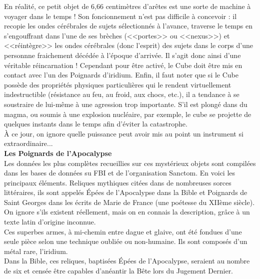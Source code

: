 \documentclass[11pt,twoside,a4paper]{book}
\begin{document}
En r{\'e}alit{\'e}, ce petit objet de 6,66 centim{\`e}tres d'ar{\^e}tes est une sorte de machine {\`a} voyager dans le temps ! Son foncionnement n'est pas difficile {\`a} concevoir : il recopie les ondes c{\'e}r{\'e}brales de sujets s{\'e}lectionn{\'e}s {\`a} l'avance, traverse le temps en s'engouffrant dans l'une de ses br{\`e}ches (<<portes>> ou <<nexus>>) et <<r{\'e}int{\`e}gre>> les ondes c{\'e}r{\'e}brales (donc l'esprit) des sujets dans le corps d'une personnne fraichement d{\'e}c{\'e}d{\'e}e {\`a} l'{\'e}poque d'arriv{\'e}e. Il s'agit donc ainsi d'une v{\'e}ritable r{\'e}incarnation ! Cependant pour {\^e}tre activ{\'e}, le Cube doit {\^e}tre mis en contact avec l'un des Poignards d'iridium. Enfin, il faut noter que si le Cube poss{\`e}de des propri{\'e}t{\'e}s physiques particuli{\`e}res qui le rendent virtuellement indestructible (r{\'e}sistance au feu, au froid, aux chocs, etc.), il a tendance {\`a} se soustraire de lui-m{\^e}me {\`a} une agression trop importante. S'il est plong{\'e} dans du magma, ou soumis {\`a} une explosion nucl{\'e}aire, par exemple, le cube se projette de quelques instants dans le temps afin d'{\'e}viter la catastrophe. ~\\

{\`A} ce jour, on ignore quelle puissance peut avoir mis au point un instrument si extraordinaire... ~\\

\textbf{\large Les Poignards de l'Apocalypse} ~\\

Les donn{\'e}es les plus compl{\`e}tes recueillies sur ces myst{\'e}rieux objets sont compil{\'e}es dans les bases de donn{\'e}es su FBI et de l'organisation Sanctom. En voici les principaux {\'e}l{\'e}ments. Reliques mythiques cit{\'e}es dans de nombreuses sorces litt{\'e}raires, ils sont appel{\'e}s {\'E}p{\'e}es de l'Apocalypse dans la Bible et Poignards de Saint Georges dans les {\'e}crits de Marie de France (une po{\'e}tesse du XII{\`e}me si{\`e}cle). On ignore s'ils existent r{\'e}ellement, mais on en connais la description, gr{\^a}ce {\`a} un texte latin d'origine inconnue. ~\\

Ces superbes armes, {\`a} mi-chemin entre dague et glaive, ont {\'e}t{\'e} fondues d'une seule pi{\`e}ce selon une technique oubli{\'e}e ou non-humaine. Ils sont compos{\'e}s d'un m{\'e}tal rare, l'iridium. ~\\

Dans la Bible, ces reliques, baptis{\'e}es {\'E}p{\'e}es de l'Apocalypse, seraient au nombre de six et cens{\'e}e {\^e}tre capables d'an{\'e}antir la B{\^e}te lors du Jugement Dernier. ~\\
\end{document}
